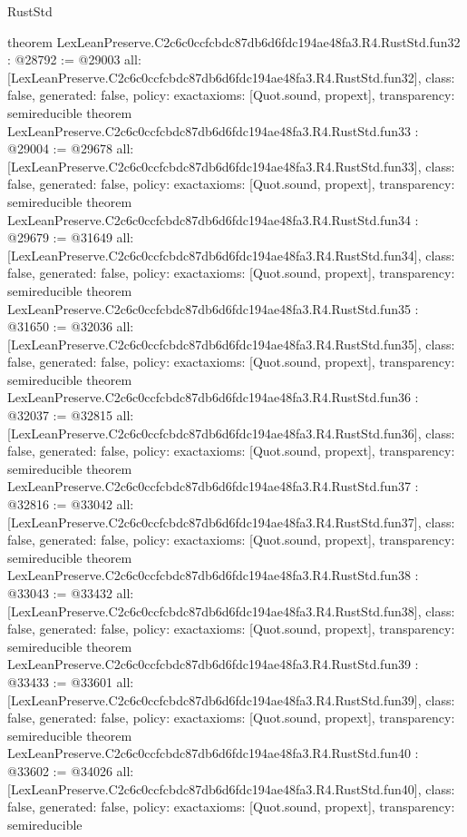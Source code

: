 \begin{lexlean}{RustStd}
\begin{coremodule}
{}
theorem LexLeanPreserve.C2c6c0ccfcbdc87db6d6fdc194ae48fa3.R4.RustStd.fun32 : @28792 := @29003 {
  all: [LexLeanPreserve.C2c6c0ccfcbdc87db6d6fdc194ae48fa3.R4.RustStd.fun32],
  class: false,
  generated: false,
  policy: exact{axioms: [Quot.sound, propext]},
  transparency: semireducible
}
theorem LexLeanPreserve.C2c6c0ccfcbdc87db6d6fdc194ae48fa3.R4.RustStd.fun33 : @29004 := @29678 {
  all: [LexLeanPreserve.C2c6c0ccfcbdc87db6d6fdc194ae48fa3.R4.RustStd.fun33],
  class: false,
  generated: false,
  policy: exact{axioms: [Quot.sound, propext]},
  transparency: semireducible
}
theorem LexLeanPreserve.C2c6c0ccfcbdc87db6d6fdc194ae48fa3.R4.RustStd.fun34 : @29679 := @31649 {
  all: [LexLeanPreserve.C2c6c0ccfcbdc87db6d6fdc194ae48fa3.R4.RustStd.fun34],
  class: false,
  generated: false,
  policy: exact{axioms: [Quot.sound, propext]},
  transparency: semireducible
}
theorem LexLeanPreserve.C2c6c0ccfcbdc87db6d6fdc194ae48fa3.R4.RustStd.fun35 : @31650 := @32036 {
  all: [LexLeanPreserve.C2c6c0ccfcbdc87db6d6fdc194ae48fa3.R4.RustStd.fun35],
  class: false,
  generated: false,
  policy: exact{axioms: [Quot.sound, propext]},
  transparency: semireducible
}
theorem LexLeanPreserve.C2c6c0ccfcbdc87db6d6fdc194ae48fa3.R4.RustStd.fun36 : @32037 := @32815 {
  all: [LexLeanPreserve.C2c6c0ccfcbdc87db6d6fdc194ae48fa3.R4.RustStd.fun36],
  class: false,
  generated: false,
  policy: exact{axioms: [Quot.sound, propext]},
  transparency: semireducible
}
theorem LexLeanPreserve.C2c6c0ccfcbdc87db6d6fdc194ae48fa3.R4.RustStd.fun37 : @32816 := @33042 {
  all: [LexLeanPreserve.C2c6c0ccfcbdc87db6d6fdc194ae48fa3.R4.RustStd.fun37],
  class: false,
  generated: false,
  policy: exact{axioms: [Quot.sound, propext]},
  transparency: semireducible
}
theorem LexLeanPreserve.C2c6c0ccfcbdc87db6d6fdc194ae48fa3.R4.RustStd.fun38 : @33043 := @33432 {
  all: [LexLeanPreserve.C2c6c0ccfcbdc87db6d6fdc194ae48fa3.R4.RustStd.fun38],
  class: false,
  generated: false,
  policy: exact{axioms: [Quot.sound, propext]},
  transparency: semireducible
}
theorem LexLeanPreserve.C2c6c0ccfcbdc87db6d6fdc194ae48fa3.R4.RustStd.fun39 : @33433 := @33601 {
  all: [LexLeanPreserve.C2c6c0ccfcbdc87db6d6fdc194ae48fa3.R4.RustStd.fun39],
  class: false,
  generated: false,
  policy: exact{axioms: [Quot.sound, propext]},
  transparency: semireducible
}
theorem LexLeanPreserve.C2c6c0ccfcbdc87db6d6fdc194ae48fa3.R4.RustStd.fun40 : @33602 := @34026 {
  all: [LexLeanPreserve.C2c6c0ccfcbdc87db6d6fdc194ae48fa3.R4.RustStd.fun40],
  class: false,
  generated: false,
  policy: exact{axioms: [Quot.sound, propext]},
  transparency: semireducible
}
\end{coremodule}
\end{lexlean}
